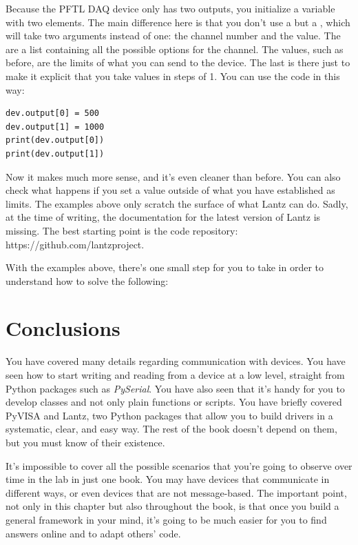 Because the {PFTL DAQ} device only has two outputs, you initialize a variable  with two elements. The main difference here is that you don't use a  but a , which will take two arguments instead of one: the channel number and the value. The  are a list containing all the possible options for the channel. The values, such as before, are the limits of what you can send to the device. The last  is there just to make it explicit that you take values in steps of 1. You can use the code in this way:

\begin{verbatim}
dev.output[0] = 500
dev.output[1] = 1000
print(dev.output[0])
print(dev.output[1])
\end{verbatim}

Now it makes much more sense, and it's even cleaner than before. You can also check what happens if you set a value outside of what you have established as limits. The examples above only scratch the surface of what Lantz can do. Sadly, at the time of writing, the documentation for the latest version of Lantz is missing. The best starting point is the code repository: https://github.com/lantzproject.

With the examples above, there's one small step for you to take in order to understand how to solve the following:


\section{Conclusions}\label{sec:conclusions2}
You have covered many details regarding communication with devices. You have seen how to start writing and reading from a device at a low level, straight from Python packages such as \emph{PySerial}. You have also seen that it's handy for you to develop classes and not only plain functions or scripts. You have briefly covered PyVISA and Lantz, two Python packages that allow you to build drivers in a systematic, clear, and easy way. The rest of the book doesn't depend on them, but you must know of their existence.

It's impossible to cover all the possible scenarios that you're going to observe over time in the lab in just one book. You may have devices that communicate in different ways, or even devices that are not message-based. The important point, not only in this chapter but also throughout the book, is that once you build a general framework in your mind, it's going to be much easier for you to find answers online and to adapt others' code.

